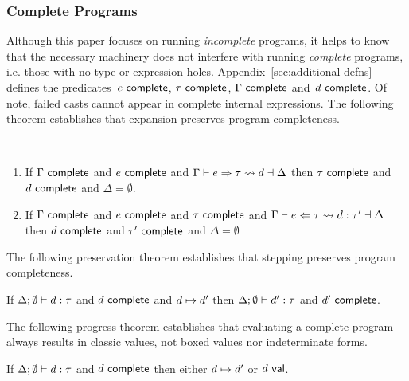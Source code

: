 \subsubsection{Complete Programs}
%
Although this paper focuses on running \emph{incomplete} programs, it helps
to know that the necessary machinery does not interfere
with running \emph{complete} programs, i.e. those
with no type or expression holes.
%
Appendix~\ref{sec:additional-defns} defines the predicates~$e~\mathsf{complete}$, $\tau~\mathsf{complete}$, $\Gamma~\mathsf{complete}$ and~$d~\mathsf{complete}$.
%
Of note, failed casts cannot appear in complete internal expressions.
%
The following theorem establishes that expansion preserves program completeness.

\begin{thm} ~
  \begin{enumerate}[nolistsep]
    \item
      If $\Gamma~\mathsf{complete}$ and $e~\mathsf{complete}$
      and $\Gamma \vdash e \Rightarrow \tau \leadsto d \dashv \Delta$
      then $\tau~\mathsf{complete}$ and $d~\mathsf{complete}$ and $\Delta = \emptyset$.
    \item
      If $\Gamma~\mathsf{complete}$ and $e~\mathsf{complete}$
and $\tau~\mathsf{complete}$
      and $\Gamma \vdash e \Leftarrow \tau \leadsto d : \tau' \dashv \Delta$
      then $d~\mathsf{complete}$ and $\tau'~\mathsf{complete}$ and $\Delta=\emptyset$
  \end{enumerate}
\end{thm}

The following preservation theorem establishes that stepping preserves program completeness.
\begin{thm}
  If $\Delta; \emptyset \vdash d : \tau$
  and $d~\mathsf{complete}$
  and $d \mapsto d'$
  then $\Delta; \emptyset \vdash d' : \tau$
  and $d'~\mathsf{complete}$.
\end{thm}

The following progress theorem establishes that evaluating a complete
program always results in classic values, not boxed values nor
indeterminate forms.
%
\begin{thm}
  If $\Delta; \emptyset \vdash d : \tau$
  and $d~\mathsf{complete}$
  then either $d \mapsto d'$
  or $d~\mathsf{val}$.
\end{thm}



